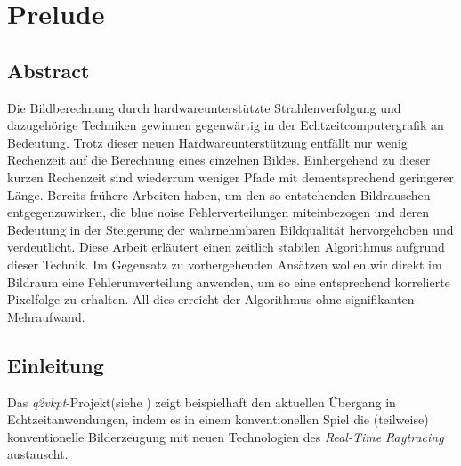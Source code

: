 \newcommand{\uproman}[1]{\uppercase\expandafter{\romannumeral#1}}
\newcommand{\lowroman}[1]{\romannumeral#1\relax}

\chapter{Prelude}
\label{ch:Introduction}

\section{Abstract}

\vspace*{\fill}

Die Bildberechnung durch hardwareunterstützte Strahlenverfolgung und dazugehörige Techniken gewinnen gegenwärtig in der Echtzeitcomputergrafik an Bedeutung. 
Trotz dieser neuen Hardwareunterstützung entfällt nur wenig Rechenzeit auf die Berechnung eines
einzelnen Bildes. Einhergehend zu dieser kurzen Rechenzeit sind wiederrum weniger Pfade mit dementsprechend geringerer
Länge. Bereits frühere Arbeiten haben, um den so entstehenden Bildrauschen entgegenzuwirken,
die blue noise Fehlerverteilungen miteinbezogen und deren Bedeutung in der Steigerung der wahrnehmbaren Bildqualität hervorgehoben und verdeutlicht.
Diese Arbeit erläutert einen zeitlich stabilen Algorithmus aufgrund dieser Technik. Im Gegensatz zu vorhergehenden Ansätzen wollen wir direkt im Bildraum eine Fehlerumverteilung anwenden, um so eine entsprechend 
korrelierte Pixelfolge zu erhalten. All dies erreicht der Algorithmus ohne signifikanten Mehraufwand.
\vfill

\newpage

\section{Einleitung}
\vspace*{\fill}

Das \textit{q2vkpt}-Projekt(siehe \cite{Sch19}) zeigt beispielhaft den aktuellen Übergang in Echtzeitanwendungen, indem es in einem konventionellen Spiel die (teilweise) konventionelle Bilderzeugung 
mit neuen Technologien des \textit{Real-Time Raytracing} austauscht.

